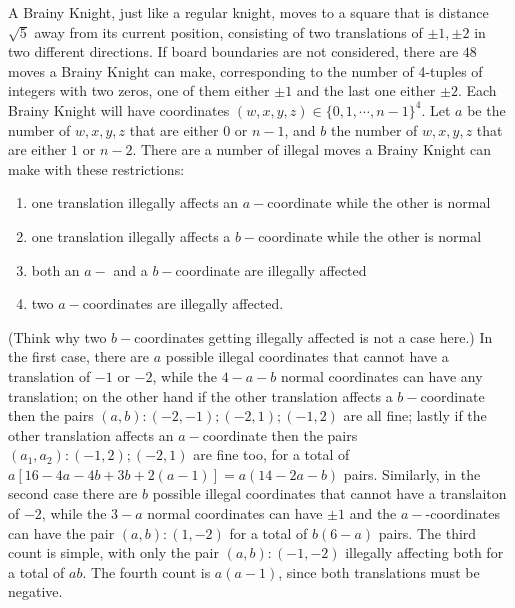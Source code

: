 \begin{solution}\hfil\medskip
  
    A Brainy Knight, just like a regular knight, moves to a square that is distance $\sqrt5$ 
    away from its current position, consisting of two translations of $\pm 1, \pm 2$ in two different directions. If board boundaries are not considered, there are $48$ 
    moves a Brainy Knight can make, corresponding to the number of 4-tuples of integers with 
    two zeros, one of them either $\pm 1$ and the last one either $\pm 2$. Each Brainy Knight 
    will have coordinates $(w, x, y, z) \in \{0, 1, \cdots , n - 1\}^4$. Let $a$ be the number 
    of $w, x, y, z$ that are either $0$ or $n - 1$, and $b$ the number of $w, x, y, z$ that are 
    either $1$ or $n - 2$. There are a number of illegal moves a Brainy Knight can make with these restrictions: 
    \begin{enumerate}[noitemsep]
        \item one translation illegally affects an $a-$coordinate while the other is normal 
        \item one translation illegally affects a $b-$coordinate while the other is normal
        \item both an $a-$ and a $b-$coordinate are illegally affected
        \item two $a-$coordinates are illegally affected.
    \end{enumerate}
    (Think why two $b-$coordinates getting illegally affected is not a case here.) In the first case, 
    there are $a$ possible illegal coordinates that cannot have a translation of $-1$ or $-2$, 
    while the $4 - a - b$ normal coordinates can have any translation; on the other hand if the 
    other translation affects a $b-$coordinate then the pairs $(a, b): (-2, -1); (-2, 1); (-1, 2)$ are 
    all fine; lastly if the other translation affects an $a-$coordinate then the pairs 
    $\left(a_1, a_2\right): (-1, 2); (-2, 1)$ are fine too, for a total of 
    $a\left[16 - 4a - 4b + 3b + 2(a - 1)\right] = a(14 - 2a - b)$ pairs. 
    Similarly, in the second case there are $b$ possible illegal coordinates that 
    cannot have a translaiton of $-2$, while the $3 - a$ normal coordinates can have $\pm 1$ 
    and the $a-$-coordinates can have the pair $(a, b): (1, -2)$ for a total of $b(6 - a)$ pairs. 
    The third count is simple, with only the pair $(a, b): (-1, -2)$ illegally affecting both 
    for a total of $ab$. The fourth count is $a(a - 1)$, since both translations must be negative. 

\end{solution}
